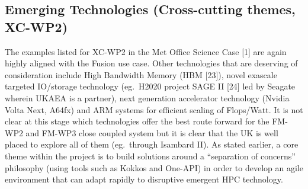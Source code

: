 \subsection*{\textbf{Emerging Technologies}  (Cross-cutting themes, \textbf{XC-WP2})}

The examples listed for XC-WP2 in the Met Office Science Case 
[1] are again highly aligned with the Fusion use case. Other technologies that 
are deserving of consideration include High Bandwidth Memory (HBM [23]), novel 
exascale targeted IO/storage technology (eg.\ H2020 project SAGE II [24] led by 
Seagate wherein UKAEA is a partner), next generation accelerator technology (Nvidia 
Volta Next, A64fx) and ARM systems for efficient scaling of Flops/Watt. It is not 
clear at this stage which technologies offer the best route forward for the FM-WP2 
and FM-WP3 close coupled system but it is clear that the UK is well placed to explore 
all of them (eg.\ through Isambard II). As stated earlier, a core theme within 
the project is to build solutions around a ``separation of concerns'' philosophy 
(using tools such as Kokkos and One-API) in order to develop an agile environment 
that can adapt rapidly to disruptive emergent HPC technology.
